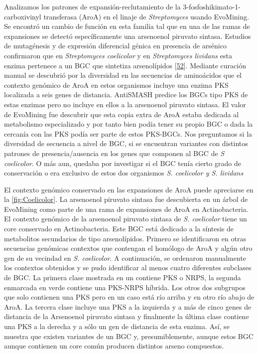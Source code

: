 \documentclass[12pt,twoside]{reedthesis}
\begin{document}
  Analizamos los patrones de expansión-reclutamiento de la
  3-fosfoshikimato-1-carboxivinyl transferasa (AroA) en el linaje de
  \emph{Streptomyces} usando EvoMining. Se encontró un cambio de función
  en esta familia tal que en una de las ramas de expansiones se detectó
  específicamente una arsenoenol piruvato sintasa. Estudios de mutagénesis
  y de expresión diferencial génica en presencia de arsénico confirmaron
  que en \emph{Streptomyces coelicolor} y en \emph{Streptomyces lividans}
  esta enzima pertenece a un BGC que sintetiza arsenolípidos
  {[}\protect\hyperlink{ref-cruz-morales_phylogenomic_2016}{52}{]}.
  Mediante curación manual se descubrió por la diversidad en las
  secuencias de aminoácidos que el contexto genómico de AroA en estos
  organismos incluye una enzima PKS localizada a seis genes de distancia.
  AntiSMASH predice los BGCs tipo PKS de estas enzimas pero no incluye en
  ellos a la arsenoenol piruvato sintasa. El valor de EvoMining fue
  descubrir que esta copia extra de AroA estaba dedicada al metabolismo
  especializado y por tanto bien podía tener su propio BGC o dada la
  cercanía con las PKS podía ser parte de estos PKS-BGCs. Nos preguntamos
  si la diversidad de secuencia a nivel de BGC, si se encuentran variantes
  con distintos patrones de presencia/ausencia en los genes que componen
  al BGC de \emph{S coelicolor}. O más aun, quedaba por investigar si el
  BGC tenía cierto grado de conservación o era exclusivo de estos dos
  organismos \emph{S. coelicolor y S. lividans}
  
  El contexto genómico conservado en las expansiones de AroA puede
  apreciarse en la \autoref{fig:Coelicolor}. La arsenoenol piruvato
  sintasa fue descubierta en un árbol de EvoMining como parte de una rama
  de expansiones de AroA en Actinobacteria. El contexto genómico de la
  arsenoenol piruvato sintasa de \emph{S. coelicolor } tiene un core
  conservado en Actinobacteria. Este BGC está dedicado a la síntesis de
  metabolitos secundarios de tipo arsenolípidos. Primero se identificaron
  en otras secuencias genómicas contextos que contengan el homólogo de
  AroA y algún otro gen de su vecindad en \emph{S. coelicolor}. A
  continuación, se ordenaron manualmente los contextos obtenidos y se pudo
  identificar al menos cuatro diferentes subclases de BGC. La primera
  clase mostrada en un contiene PKS o NRPS, la segunda enmarcada en verde
  contiene una PKS-NRPS híbrida. Los otros dos subgrupos que solo
  contienen una PKS pero en un caso está río arriba y en otro río abajo de
  AroA. La tercera clase incluye una PKS a la izquierda y a más de cinco
  genes de distancia de la Arsenoenol piruvato sintasa y finalmente la
  última clase contiene una PKS a la derecha y a sólo un gen de distancia
  de esta enzima. Así, se muestra que existen variantes de un BGC y,
  presumiblemente, aunque estos BGC aunque contienen un core común
  producen distintos arseno compuestos.
  
\end{document}
